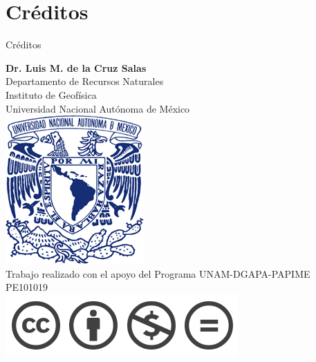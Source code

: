 \documentclass{beamer}
\begin{document}
\section{Créditos}

\begin{frame}{Créditos}
	
	\begin{center}
		\textbf{Dr. Luis M. de la Cruz Salas} \\
		\vspace{0.5cm}
		{\small{Departamento de Recursos Naturales}} \\
		\vspace{0.15cm}
		{\small{Instituto de Geof\'isica}} \\ 
		\vspace{0.15cm}
		{\small{Universidad Nacional Aut\'onoma de M\'exico}} \\
		\vspace{0.15cm}
		\includegraphics[height=.85cm]{unamlogo.png} \\
		\vspace{1.15cm}
		{\scriptsize{Trabajo realizado con el apoyo del Programa UNAM-DGAPA-PAPIME PE101019 \\		
		\includegraphics[scale=0.20]{ccPyNoxtli.png} }}
	\end{center}
	
\end{frame}
\end{document}
